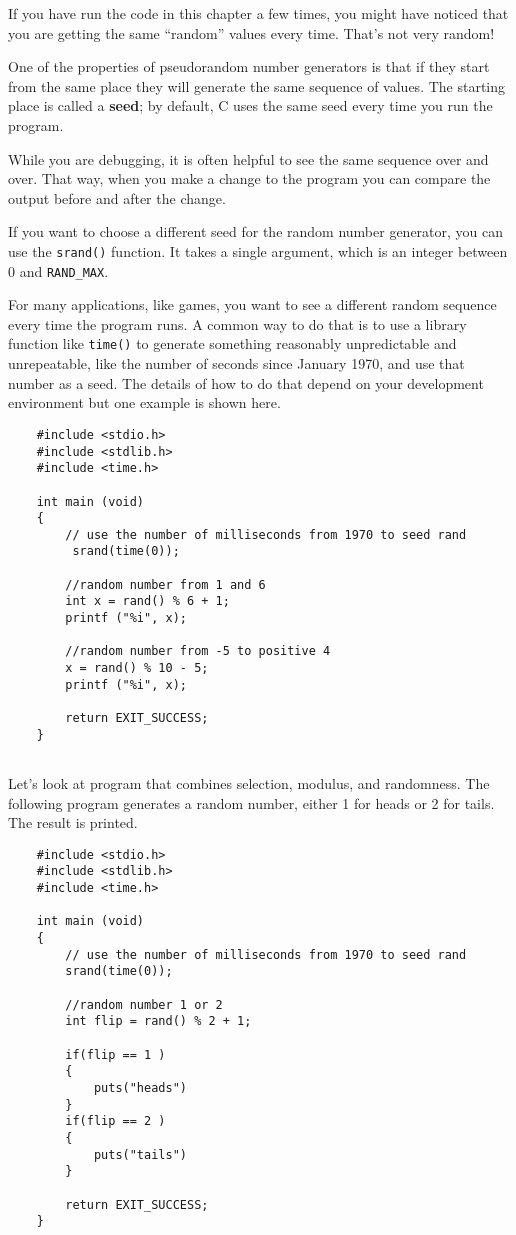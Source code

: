 If you have run the code in this chapter a few times, you might
have noticed that you are getting the same ``random'' values
every time.  That's not very random!

One of the properties of pseudorandom number generators is that
if they start from the same place they will generate
the same sequence of values.  The starting place is called
a {\bf seed}; by default, C uses
the same seed every time you run the program.

While you are debugging, it is often helpful to
see the same sequence over and over.  That way, when you make
a change to the program you can compare the output before and
after the change.

If you want to choose a different seed for the random number
generator, you can use the {\tt srand()} function.  It takes
a single argument, which is an integer between 0 and {\tt RAND\_MAX}.

For many applications, like games, you want to see a different
random sequence every time the program runs.  A common way to
do that is to use a library function like {\tt time()}
to generate something reasonably unpredictable
and unrepeatable, like the number of seconds since January
1970, and use that number as a seed.  The details
of how to do that depend on your development environment but one example is shown here.

\begin{verbatim}
	#include <stdio.h>
	#include <stdlib.h>
	#include <time.h>
	
	int main (void)
	{
	 	// use the number of milliseconds from 1970 to seed rand
	 	 srand(time(0)); 
		
	 	//random number from 1 and 6 
	  	int x = rand() % 6 + 1;
	  	printf ("%i", x);
		
	  	//random number from -5 to positive 4
	  	x = rand() % 10 - 5;
	  	printf ("%i", x);
		
	  	return EXIT_SUCCESS;
	}
	
\end{verbatim}


Let's look at program that combines selection, modulus, and randomness. The following program generates a random number, either 1 for heads or 2 for tails. The result is printed.

\begin{verbatim}
 	#include <stdio.h>
 	#include <stdlib.h>
 	#include <time.h>
	
 	int main (void)
 	{
 		// use the number of milliseconds from 1970 to seed rand
	 	srand(time(0)); 
		
	 	//random number 1 or 2
	 	int flip = rand() % 2 + 1;
 	
		if(flip == 1 )
		{
			puts("heads")
		}
		if(flip == 2 )
		{
	 	    puts("tails")
		}
		
	 	return EXIT_SUCCESS;
 	}
	
\end{verbatim}



